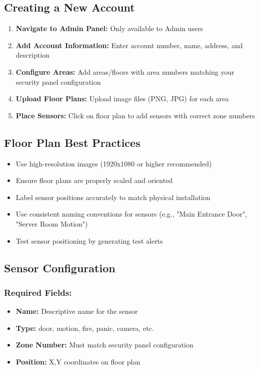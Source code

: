 \documentclass[12pt,a4paper]{article}
\begin{document}
\subsection{Creating a New Account}
\begin{enumerate}
\item \textbf{Navigate to Admin Panel:} Only available to Admin users
\item \textbf{Add Account Information:} Enter account number, name, address, and description
\item \textbf{Configure Areas:} Add areas/floors with area numbers matching your security panel configuration
\item \textbf{Upload Floor Plans:} Upload image files (PNG, JPG) for each area
\item \textbf{Place Sensors:} Click on floor plan to add sensors with correct zone numbers
\end{enumerate}

\subsection{Floor Plan Best Practices}
\begin{itemize}
\item Use high-resolution images (1920x1080 or higher recommended)
\item Ensure floor plans are properly scaled and oriented
\item Label sensor positions accurately to match physical installation
\item Use consistent naming conventions for sensors (e.g., "Main Entrance Door", "Server Room Motion")
\item Test sensor positioning by generating test alerts
\end{itemize}

\subsection{Sensor Configuration}

\subsubsection{Required Fields:}
\begin{itemize}
\item \textbf{Name:} Descriptive name for the sensor
\item \textbf{Type:} door, motion, fire, panic, camera, etc.
\item \textbf{Zone Number:} Must match security panel configuration
\item \textbf{Position:} X,Y coordinates on floor plan
\end{itemize}
\end{document}
